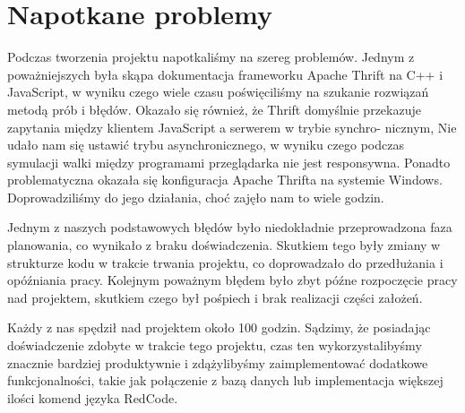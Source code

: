 \chapter{Napotkane problemy}
Podczas tworzenia projektu napotkaliśmy na szereg problemów. Jednym z poważniejszych
była skąpa dokumentacja frameworku Apache Thrift na C++ i JavaScript, w wyniku czego
wiele czasu poświęciliśmy na szukanie rozwiązań metodą prób i błędów. Okazało się również, że
Thrift domyślnie przekazuje zapytania między klientem JavaScript a serwerem w trybie synchro-
nicznym, Nie udało nam się ustawić trybu asynchronicznego, w wyniku czego podczas symulacji
walki między programami przeglądarka nie jest responsywna. Ponadto problematyczna okazała
się konfiguracja Apache Thrifta na systemie Windows. Doprowadziliśmy do jego działania, choć
zajęło nam to wiele godzin.

Jednym z naszych podstawowych błędów było niedokładnie przeprowadzona faza planowania, co wynikało z braku doświadczenia. Skutkiem tego były zmiany w strukturze kodu w trakcie trwania projektu, co doprowadzało do przedłużania i opóźniania pracy. Kolejnym poważnym błędem było zbyt późne rozpoczęcie pracy nad projektem, skutkiem czego był pośpiech i brak realizacji części założeń.

Każdy z nas spędził nad projektem około 100 godzin. Sądzimy, że posiadając doświadczenie zdobyte w trakcie tego projektu, czas ten wykorzystalibyśmy znacznie bardziej produktywnie i zdążylibyśmy zaimplementować dodatkowe funkcjonalności, takie jak połączenie z bazą danych lub implementacja większej ilości komend języka RedCode.